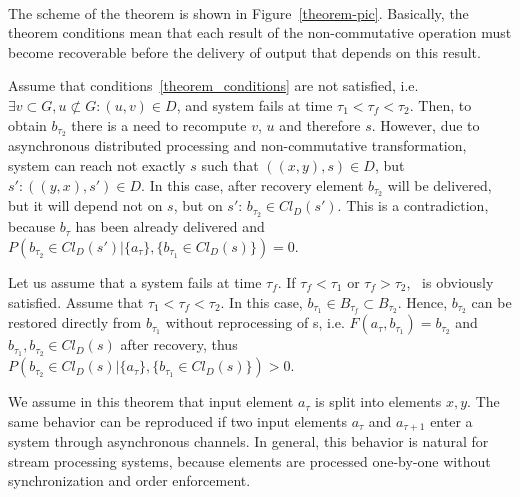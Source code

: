 \begin{sketch}
$ $\newline

The scheme of the theorem is shown in Figure~\ref{theorem-pic}. Basically, the theorem conditions mean that each result of the non-commutative operation must become recoverable before the delivery of output that depends on this result. 
$ $\newline

\newline

  Assume that conditions~\ref{theorem_conditions} are not satisfied, i.e. $\exists v \subset G, u \not\subset G: (u, v) \in D$, and system fails at time $\tau_1<\tau_f<\tau_2$. Then, to obtain $b_{\tau_2}$ there is a need to recompute $v$, $u$ and therefore $s$. However, due to asynchronous distributed processing and non-commutative transformation, system can reach not exactly $s$ such that $((x,y), s) \in D$, but $s':((y,x),s')\in D$. In this case, after recovery element $b_{\tau_2}$ will be delivered, but it will depend not on $s$, but on $s'$: $b_{\tau_2}\in Cl_D(s')$. This is a contradiction, because $b_\tau$ has been already delivered and $P(b_{\tau_2}\in Cl_D(s')|\{a_\tau\},\{b_{\tau_1} \in Cl_D(s) \})=0$.
$ $\newline

\newline

Let us assume that a  system fails at time $\tau_f$. If $\tau_f < \tau_1$ or $\tau_f > \tau_2$, \eo\ is obviously satisfied. Assume that $\tau_1<\tau_f<\tau_2$. In this case, $b_{\tau_1}\in B_{\tau_f}\subset B_{\tau_2}$. Hence, $b_{\tau_2}$ can be restored directly from $b_{\tau_1}$ without reprocessing of s, i.e. $F(a_\tau,b_{\tau_1})=b_{\tau_2}$ and $b_{\tau_1}, b_{\tau_2} \in Cl_D(s)$ after recovery, thus $P(b_{\tau_2}\in Cl_D(s)|\{a_\tau\},\{b_{\tau_1} \in Cl_D(s) \})>0$.
\end{sketch}


We assume   in this  theorem    that input element $a_\tau$ is split into elements $x,y$. The same behavior can be reproduced if two input elements $a_\tau$ and $a_{\tau+1}$ enter a system through asynchronous channels. In general, this behavior is natural for stream processing systems, because elements are processed one-by-one without synchronization and order enforcement. 

